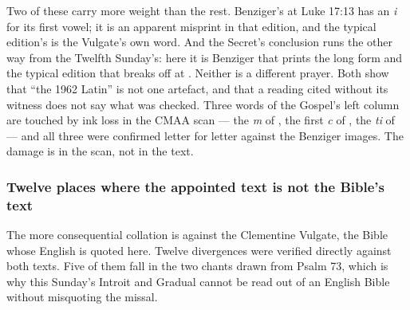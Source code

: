 Two of these carry more weight than the rest. Benziger's  at
Luke 17:13 has an \textit{i} for its first vowel;
it is an apparent misprint in that edition, and the typical edition's
 is the Vulgate's own word. And the Secret's conclusion runs
the other way from the Twelfth Sunday's: here it
is Benziger that prints the long form and the typical edition that breaks off
at . Neither is a different prayer. Both show that
``the 1962 Latin'' is not one artefact, and that a reading cited without its
witness does not say what was checked. Three words of the Gospel's left
column are touched by ink loss in the CMAA scan --- the \textit{m} of
, the first \textit{c} of , the \textit{ti} of
 --- and all three were confirmed letter for letter against the
Benziger images. The damage is in the scan, not in the text.

\subsubsection*{Twelve places where the appointed text is not the Bible's text}

The more consequential collation is against the Clementine Vulgate, the Bible
whose English is quoted here. Twelve divergences were verified directly
against both texts. Five of them fall in the two chants
drawn from Psalm 73, which is why this Sunday's Introit and Gradual cannot be
read out of an English Bible without misquoting the missal.

